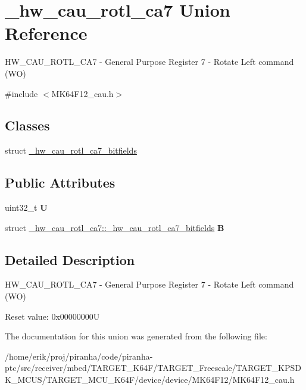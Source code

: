 \hypertarget{union__hw__cau__rotl__ca7}{}\section{\+\_\+hw\+\_\+cau\+\_\+rotl\+\_\+ca7 Union Reference}
\label{union__hw__cau__rotl__ca7}


H\+W\+\_\+\+C\+A\+U\+\_\+\+R\+O\+T\+L\+\_\+\+C\+A7 -\/ General Purpose Register 7 -\/ Rotate Left command (WO)  




{\ttfamily \#include $<$M\+K64\+F12\+\_\+cau.\+h$>$}

\subsection*{Classes}
\begin{DoxyCompactItemize}
\item 
struct \hyperlink{struct__hw__cau__rotl__ca7_1_1__hw__cau__rotl__ca7__bitfields}{\+\_\+hw\+\_\+cau\+\_\+rotl\+\_\+ca7\+\_\+bitfields}
\end{DoxyCompactItemize}
\subsection*{Public Attributes}
\begin{DoxyCompactItemize}
\item 
uint32\+\_\+t {\bfseries U}\hypertarget{union__hw__cau__rotl__ca7_a60b97d544d7eb4dda1936720119134f6}{}\label{union__hw__cau__rotl__ca7_a60b97d544d7eb4dda1936720119134f6}

\item 
struct \hyperlink{struct__hw__cau__rotl__ca7_1_1__hw__cau__rotl__ca7__bitfields}{\+\_\+hw\+\_\+cau\+\_\+rotl\+\_\+ca7\+::\+\_\+hw\+\_\+cau\+\_\+rotl\+\_\+ca7\+\_\+bitfields} {\bfseries B}\hypertarget{union__hw__cau__rotl__ca7_a5508139385565d1a1dd41916938bf6d3}{}\label{union__hw__cau__rotl__ca7_a5508139385565d1a1dd41916938bf6d3}

\end{DoxyCompactItemize}


\subsection{Detailed Description}
H\+W\+\_\+\+C\+A\+U\+\_\+\+R\+O\+T\+L\+\_\+\+C\+A7 -\/ General Purpose Register 7 -\/ Rotate Left command (WO) 

Reset value\+: 0x00000000U 

The documentation for this union was generated from the following file\+:\begin{DoxyCompactItemize}
\item 
/home/erik/proj/piranha/code/piranha-\/ptc/src/receiver/mbed/\+T\+A\+R\+G\+E\+T\+\_\+\+K64\+F/\+T\+A\+R\+G\+E\+T\+\_\+\+Freescale/\+T\+A\+R\+G\+E\+T\+\_\+\+K\+P\+S\+D\+K\+\_\+\+M\+C\+U\+S/\+T\+A\+R\+G\+E\+T\+\_\+\+M\+C\+U\+\_\+\+K64\+F/device/device/\+M\+K64\+F12/M\+K64\+F12\+\_\+cau.\+h\end{DoxyCompactItemize}

